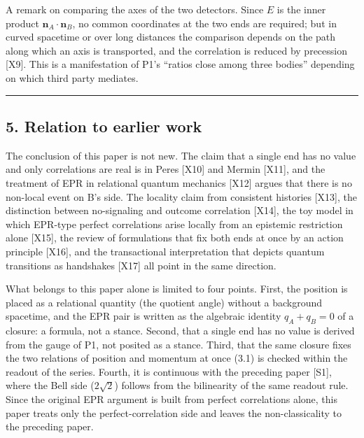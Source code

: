 \documentclass[
  a4paper,
]{article}
\begin{document}
A remark on comparing the axes of the two detectors. Since \(E\) is the
inner product \(\boldsymbol{n}_A\cdot\boldsymbol{n}_B\), no common
coordinates at the two ends are required; but in curved spacetime or
over long distances the comparison depends on the path along which an
axis is transported, and the correlation is reduced by precession
{[}X9{]}. This is a manifestation of P1's ``ratios close among three
bodies'' depending on which third party mediates.

\begin{center}\rule{0.5\linewidth}{0.5pt}\end{center}

\subsection{5. Relation to earlier work}\label{relation-to-earlier-work}

The conclusion of this paper is not new. The claim that a single end has
no value and only correlations are real is in Peres {[}X10{]} and Mermin
{[}X11{]}, and the treatment of EPR in relational quantum mechanics
{[}X12{]} argues that there is no non-local event on B's side. The
locality claim from consistent histories {[}X13{]}, the distinction
between no-signaling and outcome correlation {[}X14{]}, the toy model in
which EPR-type perfect correlations arise locally from an epistemic
restriction alone {[}X15{]}, the review of formulations that fix both
ends at once by an action principle {[}X16{]}, and the transactional
interpretation that depicts quantum transitions as handshakes {[}X17{]}
all point in the same direction.

What belongs to this paper alone is limited to four points. First, the
position is placed as a relational quantity (the quotient angle) without
a background spacetime, and the EPR pair is written as the algebraic
identity \(q_A+q_B=0\) of a closure: a formula, not a stance. Second,
that a single end has no value is derived from the gauge of P1, not
posited as a stance. Third, that the same closure fixes the two
relations of position and momentum at once (3.1) is checked within the
readout of the series. Fourth, it is continuous with the preceding paper
{[}S1{]}, where the Bell side (\(2\sqrt2\)) follows from the bilinearity
of the same readout rule. Since the original EPR argument is built from
perfect correlations alone, this paper treats only the
perfect-correlation side and leaves the non-classicality to the
preceding paper.
\end{document}
